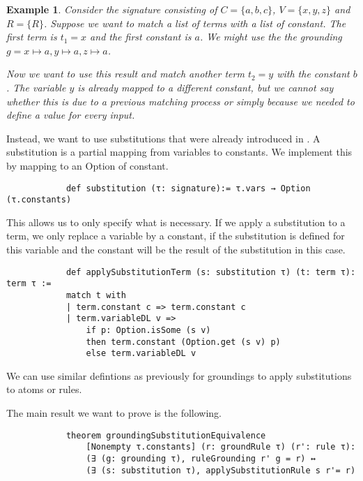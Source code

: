 \documentclass{article}
\newtheorem{example}{Example}
\begin{document}
            \begin{example}
                Consider the signature consisting of $C = \{a,b,c\}$, $V = \{x,y,z \}$ and $R = \{R\}$. Suppose we want to match a list of terms with a list of constant. The first term is $t_1 = x$ and the first constant is $a$. We might use the the grounding $g = x \mapsto a, y \mapsto a, z \mapsto a$.

                Now we want to use this result and match another term $t_2 = y$ with the constant $b$. The variable $y$ is already mapped to a different constant, but we cannot say whether this is due to a previous matching process or simply because we needed to define a value for every input.
            \end{example}

            Instead, we want to use substitutions that were already introduced in \cite{datalogCoq}. A substitution is a partial mapping from variables to constants. We implement this by mapping to an Option of constant.

            \begin{lstlisting}
            def substitution (τ: signature):= τ.vars → Option (τ.constants)
            \end{lstlisting}

            This allows us to only specify what is necessary. If we apply a substitution to a term, we only replace a variable by a constant, if the substitution is defined for this variable and the constant will be the result of the substitution in this case.

            \begin{lstlisting}
            def applySubstitutionTerm (s: substitution τ) (t: term τ): term τ :=
            match t with
            | term.constant c => term.constant c
            | term.variableDL v => 
                if p: Option.isSome (s v) 
                then term.constant (Option.get (s v) p) 
                else term.variableDL v
            \end{lstlisting}

            We can use similar defintions as previously for groundings to apply substitutions to atoms or rules.

            The main result we want to prove is the following.

            \begin{lstlisting}
            theorem groundingSubstitutionEquivalence 
                [Nonempty τ.constants] (r: groundRule τ) (r': rule τ):
                (∃ (g: grounding τ), ruleGrounding r' g = r) ↔ 
                (∃ (s: substitution τ), applySubstitutionRule s r'= r)
            \end{lstlisting}
\end{document}
